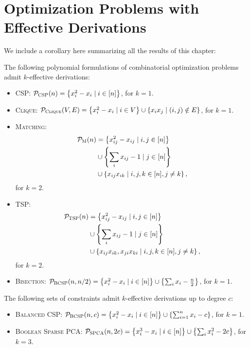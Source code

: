 \section{Optimization Problems with Effective Derivations}
We include a corollary here summarizing all the results of this chapter:
\begin{corollary}\label{cor:effective_list}
The following polynomial formulations of combinatorial optimization problems admit $k$-effective derivations:
\begin{itemize}
\item \textsc{CSP}: $\pcsp(n) = \csp$, for $k = 1$.
\item \textsc{Clique}: $\pclique(V,E) = \clique$, for $k = 1$.
\item \textsc{Matching}: 
\begin{align*}
\pmatch(n) &= \alignmatching,
\end{align*} 
for $k = 2$.
\item \textsc{TSP}: 
\begin{align*}
\ptsp(n) &= \aligntsp,
\end{align*}
for $k = 2$.
\item \textsc{Bisection}: $\pbcsp(n,n/2) = \bisec$, for $k = 1$.
\end{itemize}
The following sets of constraints admit $k$-effective derivations up to degree $c$:
\begin{itemize}
\item \textsc{Balanced CSP}: $\pbcsp(n,c) = \bcsp{n}{c}$, for $k = 1$.
\item \textsc{Boolean Sparse PCA}: $\pspca(n,2c) = \bspca{n}{2c}$, for $k = 3$.
\end{itemize}
\end{corollary}
